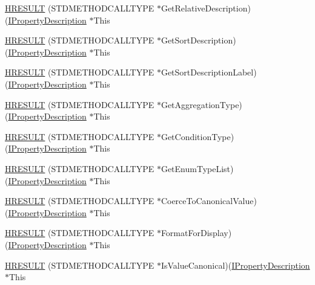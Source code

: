\begin{DoxyCompactItemize}
\item 
\hyperlink{struct_i_property_description_vtbl_a000ff809c06baa2e9e1e53d2fce919bd}{H\+R\+E\+S\+U\+LT} (S\+T\+D\+M\+E\+T\+H\+O\+D\+C\+A\+L\+L\+T\+Y\+PE $\ast$Get\+Relative\+Description)(\hyperlink{propsys_8h_a9dea4496617289c54b3e67bc2a0e8eca}{I\+Property\+Description} $\ast$This
\item 
\hyperlink{struct_i_property_description_vtbl_a0edcfce7722ab3f814839f911fc87eda}{H\+R\+E\+S\+U\+LT} (S\+T\+D\+M\+E\+T\+H\+O\+D\+C\+A\+L\+L\+T\+Y\+PE $\ast$Get\+Sort\+Description)(\hyperlink{propsys_8h_a9dea4496617289c54b3e67bc2a0e8eca}{I\+Property\+Description} $\ast$This
\item 
\hyperlink{struct_i_property_description_vtbl_a6739ddf34a3580629847dc5583c66e9e}{H\+R\+E\+S\+U\+LT} (S\+T\+D\+M\+E\+T\+H\+O\+D\+C\+A\+L\+L\+T\+Y\+PE $\ast$Get\+Sort\+Description\+Label)(\hyperlink{propsys_8h_a9dea4496617289c54b3e67bc2a0e8eca}{I\+Property\+Description} $\ast$This
\item 
\hyperlink{struct_i_property_description_vtbl_a29b215b3d43b391c4d7a2192f75180f2}{H\+R\+E\+S\+U\+LT} (S\+T\+D\+M\+E\+T\+H\+O\+D\+C\+A\+L\+L\+T\+Y\+PE $\ast$Get\+Aggregation\+Type)(\hyperlink{propsys_8h_a9dea4496617289c54b3e67bc2a0e8eca}{I\+Property\+Description} $\ast$This
\item 
\hyperlink{struct_i_property_description_vtbl_adb48f1ee12033d8be80135ccbcd6fa4f}{H\+R\+E\+S\+U\+LT} (S\+T\+D\+M\+E\+T\+H\+O\+D\+C\+A\+L\+L\+T\+Y\+PE $\ast$Get\+Condition\+Type)(\hyperlink{propsys_8h_a9dea4496617289c54b3e67bc2a0e8eca}{I\+Property\+Description} $\ast$This
\item 
\hyperlink{struct_i_property_description_vtbl_abe0199815203b62897a5392e61cc0ea6}{H\+R\+E\+S\+U\+LT} (S\+T\+D\+M\+E\+T\+H\+O\+D\+C\+A\+L\+L\+T\+Y\+PE $\ast$Get\+Enum\+Type\+List)(\hyperlink{propsys_8h_a9dea4496617289c54b3e67bc2a0e8eca}{I\+Property\+Description} $\ast$This
\item 
\hyperlink{struct_i_property_description_vtbl_a54654ba247104ba4384100be57dc80ec}{H\+R\+E\+S\+U\+LT} (S\+T\+D\+M\+E\+T\+H\+O\+D\+C\+A\+L\+L\+T\+Y\+PE $\ast$Coerce\+To\+Canonical\+Value)(\hyperlink{propsys_8h_a9dea4496617289c54b3e67bc2a0e8eca}{I\+Property\+Description} $\ast$This
\item 
\hyperlink{struct_i_property_description_vtbl_a5490b7dde3a1a6c290373bfcac98b61c}{H\+R\+E\+S\+U\+LT} (S\+T\+D\+M\+E\+T\+H\+O\+D\+C\+A\+L\+L\+T\+Y\+PE $\ast$Format\+For\+Display)(\hyperlink{propsys_8h_a9dea4496617289c54b3e67bc2a0e8eca}{I\+Property\+Description} $\ast$This
\item 
\hyperlink{struct_i_property_description_vtbl_afde4cb71530c17c737770560308a1ad7}{H\+R\+E\+S\+U\+LT} (S\+T\+D\+M\+E\+T\+H\+O\+D\+C\+A\+L\+L\+T\+Y\+PE $\ast$Is\+Value\+Canonical)(\hyperlink{propsys_8h_a9dea4496617289c54b3e67bc2a0e8eca}{I\+Property\+Description} $\ast$This
\end{DoxyCompactItemize}

